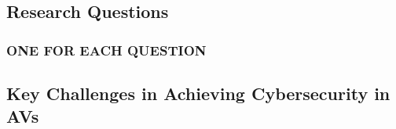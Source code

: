 \subsection{Research Questions}\label{subsec:research-questions}
\subsubsection{ONE FOR EACH QUESTION}
\subsection{Key Challenges in Achieving Cybersecurity in AVs}\label{subsec:key-challenges-in-achieving-cybersecurity-in-avs}
